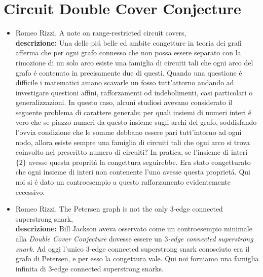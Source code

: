 \documentclass[10pt]{article}
\begin{document}
\section{Circuit Double Cover Conjecture}

\begin{itemize}
  \vspace{1.4mm}
  \item[] {\sc Romeo Rizzi},
   \newblock  A note on range-restricted circuit covers,
   \\
{\bf descrizione:}
Una delle pi\'u belle ed ambite congetture
in teoria dei grafi afferma che per ogni grafo
connesso che non possa essere separato
con la rimozione di un solo arco esiste
una famiglia di circuiti tali
che ogni arco del grafo
\'e contenuto in precisamente due di questi.
Quando una questione \'e difficile
i matematici amano scavarle un fosso tutt'attorno
andando ad investigare questioni affini, rafforzamenti od
indebolimenti, casi particolari o generalizzazioni.
In questo caso,
alcuni studiosi avevano
considerato il seguente problema
di carattere generale:
per quali insiemi di numeri interi \'e vero che se piazzo
numeri da questo insieme sugli archi del grafo,
soddisfando l'ovvia condizione che le somme debbano essere
pari tutt'intorno ad ogni nodo,
allora esiste sempre
una famiglia di circuiti tali che ogni arco
si trova coinvolto nel prescritto numero di circuiti?
In pratica, se l'insieme di interi $\{2\}$
avesse questa proprit\'a
la congettura seguirebbe. 
Era stato congetturato che
ogni insieme di interi non contenente l'uno
avesse questa propriet\'a.
Qui noi si \'e dato un controesempio
a questo rafforzamento evidentemente eccessivo.\\

  \vspace{1.4mm}
  \item[] {\sc Romeo Rizzi},
   \newblock  The Petersen graph is not the only $3$-edge
              connected superstrong snark,
   \\
{\bf descrizione:}
Bill Jackson aveva osservato come
un controesempio minimale alla
{\em Double Cover Conjecture}
dovesse essere un
{\em $3$-edge connected superstrong snark}.
Ad oggi l'unico $3$-edge connected superstrong snark
conosciuto era il grafo di Petersen,
e per esso la congettura vale.
Qui noi forniamo una famiglia infinita di
$3$-edge connected superstrong snarks.\\


\end{itemize}
\end{document}
